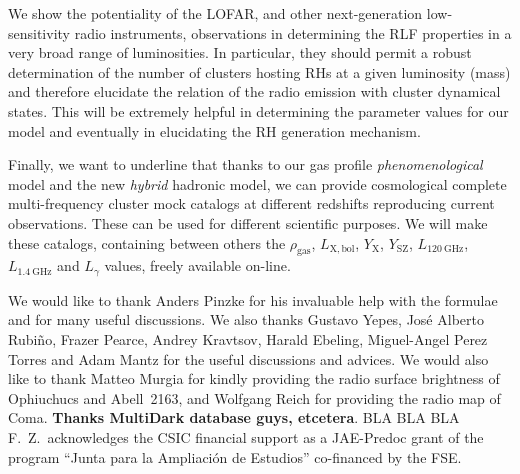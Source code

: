 \documentclass[traditabstract]{aa}
\newcommand{\rmn}{\mathrm}
\begin{document}
We show the potentiality of the LOFAR, and other next-generation low-sensitivity radio instruments, observations in determining the RLF properties in a very broad range of luminosities. In particular, they should permit a robust determination of the number of clusters hosting RHs at a given luminosity (mass) and therefore elucidate the relation of the radio emission with cluster dynamical states. This will be extremely helpful in determining the parameter values for our model and eventually in elucidating the RH generation mechanism.

Finally, we want to underline that thanks to our gas profile \emph{phenomenological} model and the new \emph{hybrid} hadronic model, we can provide cosmological complete multi-frequency cluster mock catalogs at different redshifts reproducing current observations. These can be used for different scientific purposes. We will make these catalogs, containing between others the $\rho_{\rmn{gas}}$, $L_{\rmn{X, bol}}$, $Y_{\rmn{X}}$, $Y_{\rmn{SZ}}$, $L_{120~\rmn{GHz}}$, $L_{1.4~\rmn{GHz}}$ and $L_{\gamma}$ values, freely available on-line.


\begin{acknowledgements}
We would like to thank Anders Pinzke for his invaluable help with the formulae and for many useful discussions. We also thanks Gustavo Yepes, Jos\'e Alberto Rubi\~no, Frazer Pearce, Andrey Kravtsov, Harald Ebeling, Miguel-Angel Perez Torres and Adam Mantz for the useful discussions and advices. We would also like to thank Matteo Murgia for kindly providing the radio surface brightness of Ophiuchucs and Abell~2163, and Wolfgang Reich for providing the radio map of Coma. {\bf Thanks MultiDark database guys, etcetera}.
BLA BLA BLA\\ 
F.~Z.~acknowledges the CSIC financial support as a JAE-Predoc grant of the program ``Junta para la Ampliaci\'on de Estudios'' co-financed by the FSE.
\end{acknowledgements}
\end{document}
